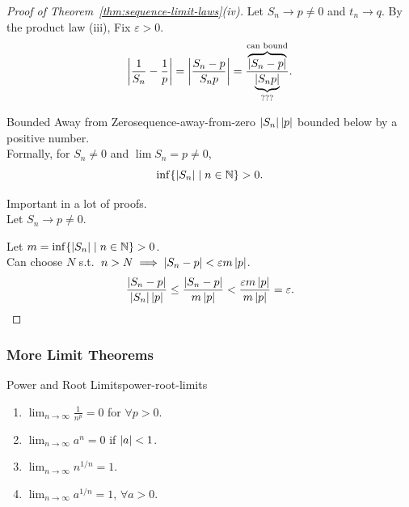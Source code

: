 \begin{proof}[Proof of Theorem~\ref{thm:sequence-limit-laws}(iv)]
  Let $S_n\to p\ne0$ and $t_n\to q$. By the product law (iii),
  Fix $\varepsilon>0$.
  \[
    \left|\frac1{S_n}-\frac1p\right|
    =\left|\frac{S_n-p}{S_np}\right|
    =\frac{\overbrace{\left\lvert S_n-p \right\rvert}^{\text{can bound}}}
    {\underbrace{\left\lvert S_np \right\rvert}_{\text{???}}}.
  \]

  \begin{lemma}{Bounded Away from Zero}{sequence-away-from-zero}
    $\left\lvert S_n \right\rvert\left\lvert p \right\rvert$ bounded below by a positive number.\\
    Formally, for $S_n\ne0$ and $\lim S_n=p\ne0$,
    \[
      \inf\{\left\lvert S_n \right\rvert\mid n\in\mathbb{N}\}>0.
    \]
  \end{lemma}
  \begin{thinking}
    Important in a lot of proofs.\\
    Let $S_n\to p\ne0$.
    \begin{center}
    \end{center}
  \end{thinking}
  Let $m=\inf\{\left\lvert S_n \right\rvert\mid n\in\mathbb{N}\}>0$.\\
  Can choose $N$ s.t.\ $n>N\implies\left\lvert S_n-p \right\rvert<\varepsilon m\left\lvert p \right\rvert$.
  \[
    \frac{\left\lvert S_n-p \right\rvert}{\left\lvert S_n \right\rvert\left\lvert p \right\rvert}
    \le\frac{\left\lvert S_n-p \right\rvert}{m\left\lvert p \right\rvert}
    <\frac{\varepsilon m\left\lvert p \right\rvert}{m\left\lvert p \right\rvert}=\varepsilon.\qedhere
  \]
\end{proof}

\subsubsection{More Limit Theorems}

\begin{theorem}{Power and Root Limits}{power-root-limits}
  \begin{enumerate}[label=(\roman*)]
    \item $\displaystyle\lim_{n\to\infty}\frac1{n^p}=0$ for $\forall p>0$.
    \item $\displaystyle\lim_{n\to\infty}a^n=0$ if $\left\lvert a \right\rvert<1$.
    \item $\displaystyle\lim_{n\to\infty}n^{1/n}=1$.
    \item $\displaystyle\lim_{n\to\infty}a^{1/n}=1$, $\forall a>0$.
  \end{enumerate}
\end{theorem}

